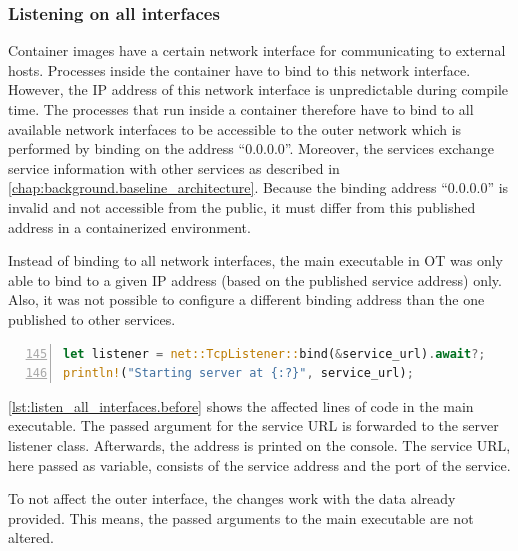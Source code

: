 \subsubsection*{Listening on all interfaces}
Container images have a certain network interface for communicating to external hosts. Processes inside the container have to bind to this network interface. However, the \ac{IP} address of this network interface is unpredictable during compile time. The processes that run inside a container therefore have to bind to all available network interfaces to be accessible to the outer network which is performed by binding on the address \enquote{0.0.0.0}.
Moreover, the services exchange service information with other services as described in \autoref{chap:background.baseline_architecture}. Because the binding address \enquote{0.0.0.0} is invalid and not accessible from the public, it must differ from this published address in a containerized environment.

Instead of binding to all network interfaces, the main executable in \ac{OT} was only able to bind to a given \ac{IP} address (based on the published service address) only. Also, it was not possible to configure a different binding address than the one published to other services.

\begin{lstlisting}[label=lst:listen_all_interfaces.before, caption={Listener binding before the applied changes (\textit{Microservices/OpenTwin/src/main.rs})}, language=rust, firstnumber=145, numbers=left]
let listener = net::TcpListener::bind(&service_url).await?;
println!("Starting server at {:?}", service_url);
\end{lstlisting}
\autoref{lst:listen_all_interfaces.before} shows the affected lines of code in the main executable. The passed argument for the service \ac{URL} is forwarded to the server listener class. Afterwards, the address is printed on the console. The service \ac{URL}, here passed as variable, consists of the service address and the port of the service.

To not affect the outer interface, the changes work with the data already provided. This means, the passed arguments to the main executable are not altered.

